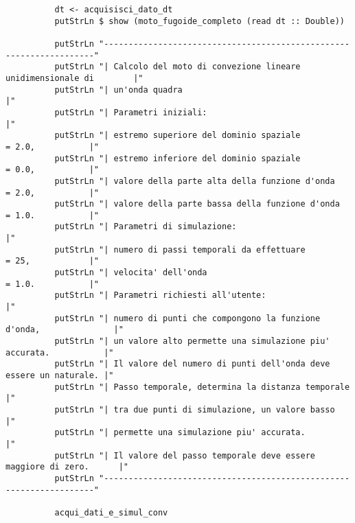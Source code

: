 \begin{verbatim}
          dt <- acquisisci_dato_dt
          putStrLn $ show (moto_fugoide_completo (read dt :: Double))

          putStrLn "--------------------------------------------------------------------"
          putStrLn "| Calcolo del moto di convezione lineare unidimensionale di        |"
          putStrLn "| un'onda quadra                                                   |"
          putStrLn "| Parametri iniziali:                                              |"
          putStrLn "| estremo superiore del dominio spaziale          = 2.0,           |"
          putStrLn "| estremo inferiore del dominio spaziale          = 0.0,           |" 
          putStrLn "| valore della parte alta della funzione d'onda   = 2.0,           |" 
          putStrLn "| valore della parte bassa della funzione d'onda  = 1.0.           |"
          putStrLn "| Parametri di simulazione:                                        |"
          putStrLn "| numero di passi temporali da effettuare         = 25,            |" 
          putStrLn "| velocita' dell'onda                             = 1.0.           |" 
          putStrLn "| Parametri richiesti all'utente:                                  |" 
          putStrLn "| numero di punti che compongono la funzione d'onda,               |"
          putStrLn "| un valore alto permette una simulazione piu' accurata.           |"
          putStrLn "| Il valore del numero di punti dell'onda deve essere un naturale. |"
          putStrLn "| Passo temporale, determina la distanza temporale                 |"
          putStrLn "| tra due punti di simulazione, un valore basso                    |"
          putStrLn "| permette una simulazione piu' accurata.                          |"
          putStrLn "| Il valore del passo temporale deve essere maggiore di zero.      |"
          putStrLn "--------------------------------------------------------------------"

          acqui_dati_e_simul_conv


\end{verbatim}
